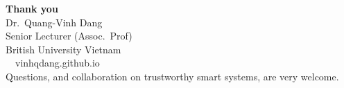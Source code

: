 \documentclass[aspectratio=169,10pt]{beamer}
\begin{document}
\begin{frame}[plain]
\centering
\vspace{14mm}
{\Huge\bfseries\color{tdBlue} Thank you}\\[6mm]
{\large Dr.\ Quang-Vinh Dang}\\[1mm]
{\small Senior Lecturer (Assoc.\ Prof)}\\[2mm]
{\small British University Vietnam}\\[2mm]
{\small\faGlobe\ \ vinhqdang.github.io}\\[8mm]
{\small Questions, and collaboration on trustworthy smart systems, are very welcome.}
\end{frame}
\end{document}
